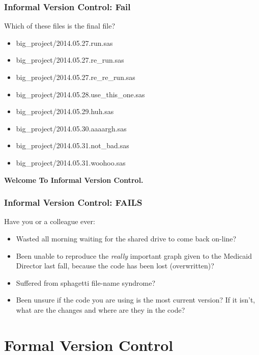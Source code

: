 \documentclass{beamer}
\begin{document}
\begin{frame} %
  \frametitle{Informal Version Control: Fail}
  {\large Which of these files is the final file?}
  \bigskip
  \begin{itemize}
  \item big\_project/2014.05.27.run.sas
  \item big\_project/2014.05.27.re\_run.sas
  \item big\_project/2014.05.27.re\_re\_run.sas
  \item big\_project/2014.05.28.use\_this\_one.sas
  \item big\_project/2014.05.29.huh.sas
  \item big\_project/2014.05.30.aaaargh.sas
  \item big\_project/2014.05.31.not\_bad.sas
  \item big\_project/2014.05.31.woohoo.sas
  \end{itemize}

  \bigskip
  \begin{center}
  \textbf{Welcome To Informal Version Control.}
  \end{center}
  
\end{frame}

\begin{frame}  %
  \frametitle{Informal Version Control: FAILS}
  {\large Have you or a colleague ever:}
  \bigskip
  \begin{itemize}
  \item Wasted all morning waiting for the shared drive to come back
    on-line?
  \item Been unable to reproduce the \emph{really} important graph
    given to the Medicaid Director last fall, because the code has
    been lost (overwritten)?
  \item Suffered from sphagetti file-name syndrome?
  \item Been unsure if the code you are using is the most current
    version? If it isn't, what are the changes and where are they in
    the code?
  \end{itemize}
\end{frame}


\section{Formal Version Control} %
\end{document}
